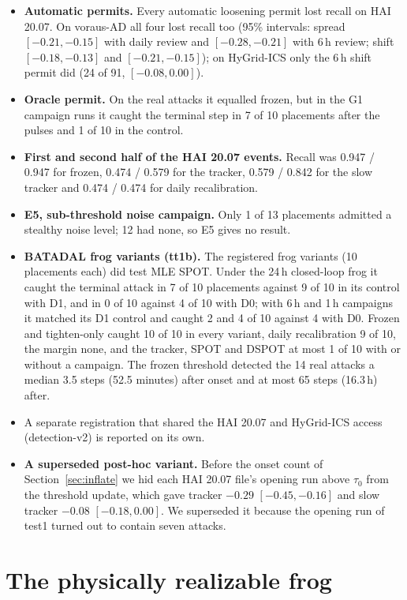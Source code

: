 \documentclass[letterpaper,twocolumn,10pt]{article}
\begin{document}
\begin{itemize}
\item \textbf{Automatic permits.} Every automatic loosening permit lost recall on HAI 20.07. On
  voraus-AD all four lost recall too (95\% intervals: spread $[-0.21, -0.15]$ with daily review and
  $[-0.28, -0.21]$ with 6\,h review; shift $[-0.18, -0.13]$ and $[-0.21, -0.15]$); on HyGrid-ICS only
  the 6\,h shift permit did (24 of 91, $[-0.08, 0.00]$).
\item \textbf{Oracle permit.} On the real attacks it equalled frozen, but in the G1 campaign runs it
  caught the terminal step in 7 of 10 placements after the pulses and 1 of 10 in the control.
\item \textbf{First and second half of the HAI 20.07 events.} Recall was 0.947 / 0.947 for frozen,
  0.474 / 0.579 for the tracker, 0.579 / 0.842 for the slow tracker and 0.474 / 0.474 for daily
  recalibration.
\item \textbf{E5, sub-threshold noise campaign.} Only 1 of 13 placements admitted a stealthy noise
  level; 12 had none, so E5 gives no result.
\item \textbf{BATADAL frog variants (tt1b).} The registered frog variants (10 placements each) did test MLE SPOT. Under the 24\,h closed-loop frog it caught the terminal attack in 7 of 10 placements against 9 of 10 in its control with D1, and in 0 of 10 against 4 of 10 with D0; with 6\,h and 1\,h campaigns it matched its D1 control and caught 2 and 4 of 10 against 4 with D0. Frozen and tighten-only caught 10 of 10 in every variant, daily recalibration 9 of 10, the margin none, and the tracker, SPOT and DSPOT at most 1 of 10 with or without a campaign. The frozen threshold detected the 14 real attacks a median 3.5 steps (52.5 minutes) after onset and at most 65 steps (16.3\,h) after.
\item A separate registration that shared the HAI 20.07 and HyGrid-ICS access (detection-v2) is reported
  on its own.
\item \textbf{A superseded post-hoc variant.} Before the onset count of Section~\ref{sec:inflate} we
  hid each HAI 20.07 file's opening run above $\tau_0$ from the threshold update, which gave tracker
  $-0.29$ $[-0.45, -0.16]$ and slow tracker $-0.08$ $[-0.18, 0.00]$. We superseded it because the
  opening run of test1 turned out to contain seven attacks.
\end{itemize}

\section{The physically realizable frog}
\label{app:physfrog}
\end{document}
